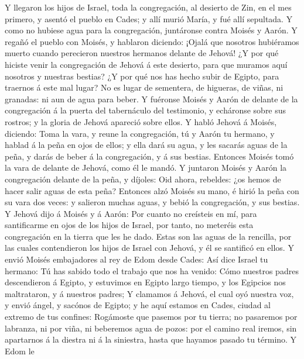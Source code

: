  Y llegaron los hijos de Israel, toda la congregación, al
desierto de Zin, en el mes primero, y asentó el pueblo en Cades; y allí
murió María, y fué allí sepultada.  Y como no hubiese agua
para la congregación, juntáronse contra Moisés y Aarón.  Y
regañó el pueblo con Moisés, y hablaron diciendo: ¡Ojalá que nosotros
hubiéramos muerto cuando perecieron nuestros hermanos delante de Jehová!
 ¿Y por qué hiciste venir la congregación de Jehová á este
desierto, para que muramos aquí nosotros y nuestras bestias?
 ¿Y por qué nos has hecho subir de Egipto, para traernos á
este mal lugar? No es lugar de sementera, de higueras, de viñas, ni
granadas: ni aun de agua para beber.  Y fuéronse Moisés y
Aarón de delante de la congregación á la puerta del tabernáculo del
testimonio, y echáronse sobre sus rostros; y la gloria de Jehová
apareció sobre ellos.  Y habló Jehová á Moisés, diciendo:
 Toma la vara, y reune la congregación, tú y Aarón tu
hermano, y hablad á la peña en ojos de ellos; y ella dará su agua, y les
sacarás aguas de la peña, y darás de beber á la congregación, y á sus
bestias.  Entonces Moisés tomó la vara de delante de Jehová,
como él le mandó.  Y juntaron Moisés y Aarón la
congregación delante de la peña, y díjoles: Oid ahora, rebeldes: ¿os
hemos de hacer salir aguas de esta peña?  Entonces alzó
Moisés su mano, é hirió la peña con su vara dos veces: y salieron muchas
aguas, y bebió la congregación, y sus bestias.  Y Jehová
dijo á Moisés y á Aarón: Por cuanto no creísteis en mí, para
santificarme en ojos de los hijos de Israel, por tanto, no meteréis esta
congregación en la tierra que les he dado.  Estas son las
aguas de la rencilla, por las cuales contendieron los hijos de Israel
con Jehová, y él se santificó en ellos.  Y envió Moisés
embajadores al rey de Edom desde Cades: Así dice Israel tu hermano: Tú
has sabido todo el trabajo que nos ha venido:  Cómo
nuestros padres descendieron á Egipto, y estuvimos en Egipto largo
tiempo, y los Egipcios nos maltrataron, y á nuestros padres;
 Y clamamos á Jehová, el cual oyó nuestra voz, y envió
ángel, y sacónos de Egipto; y he aquí estamos en Cades, ciudad al
extremo de tus confines:  Rogámoste que pasemos por tu
tierra; no pasaremos por labranza, ni por viña, ni beberemos agua de
pozos: por el camino real iremos, sin apartarnos á la diestra ni á la
siniestra, hasta que hayamos pasado tu término.  Y Edom le
